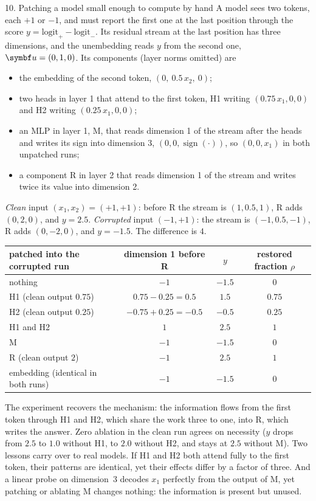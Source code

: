 \documentclass[11pt]{article}
\newcommand{\uv}{\vect{u}}
\begin{document}
\begin{worked}{10. Patching a model small enough to compute by hand}
A model sees two tokens, each $+1$ or $-1$, and must report the first one at the last position through the score
$y = \text{logit}_{+} - \text{logit}_{-}$. Its residual stream at the last position has three dimensions, and the unembedding
reads $y$ from the second one, $\uv = (0, 1, 0)$. Its components (layer norms omitted) are
\begin{itemize}
\item the embedding of the second token, $(0,\ 0.5\,x_2,\ 0)$;
\item two heads in layer 1 that attend to the first token, H1 writing $(0.75\,x_1, 0, 0)$ and H2 writing $(0.25\,x_1, 0, 0)$;
\item an MLP in layer 1, M, that reads dimension 1 of the stream after the heads and writes its sign into dimension 3,
  $(0, 0, \operatorname{sign}(\cdot))$, so $(0, 0, x_1)$ in both unpatched runs;
\item a component R in layer 2 that reads dimension 1 of the stream and writes twice its value into dimension 2.
\end{itemize}
\emph{Clean} input $(x_1, x_2) = (+1, +1)$: before R the stream is $(1, 0.5, 1)$, R adds $(0, 2, 0)$, and $y = 2.5$.
\emph{Corrupted} input $(-1, +1)$: the stream is $(-1, 0.5, -1)$, R adds $(0, -2, 0)$, and $y = -1.5$. The difference is $4$.
\begin{center}\small
\begin{tabular}{@{}lccc@{}}
\toprule
patched into the corrupted run & dimension 1 before R & $y$ & restored fraction $\rho$ \\
\midrule
nothing & $-1$ & $-1.5$ & $0$ \\
H1 (clean output $0.75$) & $0.75 - 0.25 = 0.5$ & $1.5$ & $0.75$ \\
H2 (clean output $0.25$) & $-0.75 + 0.25 = -0.5$ & $-0.5$ & $0.25$ \\
H1 and H2 & $1$ & $2.5$ & $1$ \\
M & $-1$ & $-1.5$ & $0$ \\
R (clean output $2$) & $-1$ & $2.5$ & $1$ \\
embedding (identical in both runs) & $-1$ & $-1.5$ & $0$ \\
\bottomrule
\end{tabular}
\end{center}
The experiment recovers the mechanism: the information flows from the first token through H1 and H2, which share the work
three to one, into R, which writes the answer. Zero ablation in the clean run agrees on necessity ($y$ drops from $2.5$ to
$1.0$ without H1, to $2.0$ without H2, and stays at $2.5$ without M). Two lessons carry over to real models. If H1 and H2
both attend fully to the first token, their patterns are identical, yet their effects differ by a factor of three. And a
linear probe on dimension~3 decodes $x_1$ perfectly from the output of M, yet patching or ablating M changes nothing: the
information is present but unused.
\end{worked}
\end{document}
